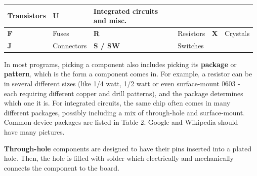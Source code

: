 \documentclass[letterpaper]{article}
\begin{document}
\begin{flushleft}
\begin{supertabular}{|m{0.42475984in}|m{1.9219599in}|m{0.42055985in}|m{1.9233599in}|m{0.41915986in}|m{1.9247599in}|}
{\sffamily\color[rgb]{0.30980393,0.5058824,0.7411765} Transistors} &
{\sffamily\bfseries\color[rgb]{0.30980393,0.5058824,0.7411765} U} &
{\sffamily\color[rgb]{0.30980393,0.5058824,0.7411765} Integrated circuits and misc.}\\\hline
{\sffamily\bfseries\color[rgb]{0.30980393,0.5058824,0.7411765} F} &
{\sffamily\color[rgb]{0.30980393,0.5058824,0.7411765} Fuses} &
{\sffamily\bfseries\color[rgb]{0.30980393,0.5058824,0.7411765} R} &
{\sffamily\color[rgb]{0.30980393,0.5058824,0.7411765} Resistors} &
{\sffamily\bfseries\color[rgb]{0.30980393,0.5058824,0.7411765} X} &
{\sffamily\color[rgb]{0.30980393,0.5058824,0.7411765} Crystals}\\\hline
{\sffamily\bfseries\color[rgb]{0.30980393,0.5058824,0.7411765} J} &
{\sffamily\color[rgb]{0.30980393,0.5058824,0.7411765} Connectors} &
{\sffamily\color[rgb]{0.30980393,0.5058824,0.7411765} \textbf{S / SW}} &
{\sffamily\color[rgb]{0.30980393,0.5058824,0.7411765} Switches} &
~
 &
~
\\\hline
\end{supertabular}
\end{flushleft}

\bigskip

{\sffamily\color[rgb]{0.30980393,0.5058824,0.7411765}
In most programs, picking a component also includes picking its \textbf{package} or \textbf{pattern}, which is the form
a component comes in. For example, a resistor can be in several different sizes (like 1/4 watt, 1/2 watt or even
surface-mount 0603 - each requiring different copper and drill patterns), and the package determines which one it is.
For integrated circuits, the same chip often comes in many different packages, possibly including a mix of through-hole
and surface-mount. Common device packages are listed in Table 2. Google and Wikipedia should have many pictures.}


\bigskip

{\sffamily\color[rgb]{0.30980393,0.5058824,0.7411765}
\textbf{Through-hole} components are designed to have their pins inserted into a plated hole. Then, the hole is filled
with solder which electrically and mechanically connects the component to the board.}
\end{document}
